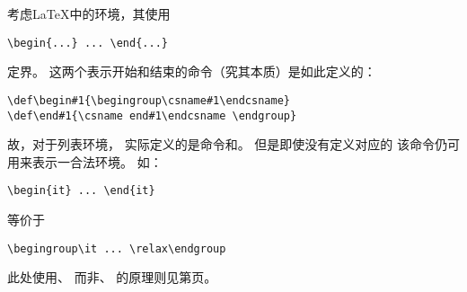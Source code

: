 \documentclass{book}
\begin{document}
考虑{\LaTeX}中的环境，其使用
\begin{verbatim}
\begin{...} ... \end{...}
\end{verbatim}
定界。
这两个表示开始和结束的命令（究其本质）是如此定义的：
\begin{verbatim}
\def\begin#1{\begingroup\csname#1\endcsname}
\def\end#1{\csname end#1\endcsname \endgroup}
\end{verbatim}
故，对于列表环境，
实际定义的是命令和。
但是即使没有定义对应的
该命令仍可用来表示一合法环境。
如：
\begin{verbatim}
\begin{it} ... \end{it}
\end{verbatim}
等价于
\begin{verbatim}
\begingroup\it ... \relax\endgroup
\end{verbatim}
此处使用、
而非、
的原理则见第\pageref{begin:end:macros}页。

\end{document}

